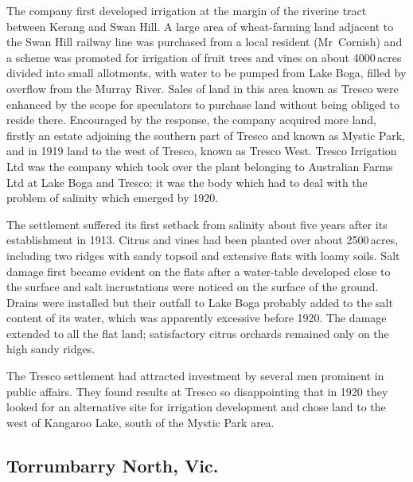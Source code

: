 The company first developed irrigation at the margin of the riverine
tract between Kerang and Swan Hill.  A large area of
wheat-farming land adjacent to the Swan Hill
railway line was purchased from a local resident
(Mr~Cornish) and a scheme was promoted for irrigation of
fruit trees and vines on about
4000\,acres divided into small allotments, with water to be pumped
from Lake Boga,  filled by overflow from the Murray
River.  Sales of land in this area known as Tresco were enhanced by
the scope for speculators to purchase land without being obliged to
reside there.  Encouraged by the response, the company acquired more
land, firstly an estate adjoining the southern part of Tresco and
known as Mystic Park, and in 1919 land to the west of Tresco, known as
Tresco West.  Tresco Irrigation Ltd  was
the company which took over the plant belonging to Australian Farms
Ltd at Lake Boga and Tresco; it was the body which had to deal with
the problem of salinity which emerged by
1920.

The settlement suffered its first setback from salinity about five
years after its establishment in 1913.  Citrus and
vines had been planted over about 2500\,acres,
including two ridges with sandy topsoil and extensive flats with loamy
soils.  Salt damage  first became evident on the flats
after a water-table developed close to the surface and salt
incrustations were noticed on the surface of the ground.  Drains were
installed but their outfall to Lake Boga probably added to the salt
content of its water, which was apparently excessive before 1920. The
damage extended to all the flat land; satisfactory citrus orchards
remained only on the high sandy ridges.

The Tresco settlement had attracted investment by several men
pro\-minent in public affairs.  They found results at Tresco so
disappointing that in 1920 they looked for an alternative site for
irrigation development and chose land to the west of Kangaroo Lake,
south of the Mystic Park area.

\subsection*{Torrumbarry North, Vic.}

